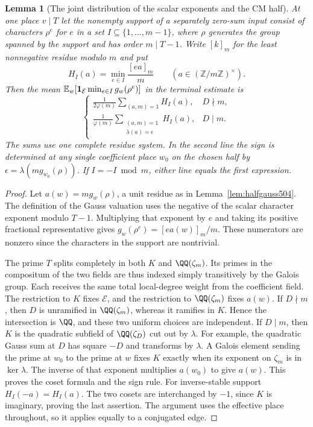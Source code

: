 \documentclass[a4paper,11pt]{article}
\newtheorem{lemma}[proposition]{Lemma}
\theoremstyle{definition}
\theoremstyle{remark}
\newcommand{\ZZ}{\mathbb Z}\newcommand{\ord}{\operatorname{ord}}
\numberwithin{equation}{section}
\begin{document}
\begin{lemma}[The joint distribution of the scalar exponents and the CM half]\leavevmode
\label{lem:jointcm508}
At one place \(v\mid T\) let the nonempty support of a separately
zero-sum input consist of characters \(\rho^e\) for \(e\) in a
set \(I\subseteq\{1,\ldots,m-1\}\), where \(\rho\) generates
the group spanned by the support and has order \(m\mid T-1\).
Write \([k]_m\) for the least nonnegative residue modulo \(m\)
and put
\[
      H_I(a)=\min_{e\in I}\frac{[ea]_m}{m}
                      \qquad (a\in(\ZZ/m\ZZ)^\times).
\]
Then the mean \(\mathbb E_w[{\bf1}_{\mathcal E}
\min_{e\in I}g_w(\rho^e)]\) in the terminal estimate is
\[
 \begin{cases}
 \displaystyle\frac{1}{2\varphi(m)}
              \sum_{(a,m)=1}H_I(a), &D\nmid m,\\[6pt]
 \displaystyle\frac{1}{\varphi(m)}
              \sum_{\substack{(a,m)=1\\\lambda(a)=\epsilon}}H_I(a),
                                                    &D\mid m .
 \end{cases}
\]
The sums use one complete residue system. In the second line the
sign is determined at any single coefficient place \(w_0\)
on the chosen half by \(\epsilon=\lambda(mg_{w_0}(\rho))\).
If \(I=-I\bmod m\), either line equals the first expression.
\end{lemma}
\begin{proof}
Let \(a(w)=m g_w(\rho)\), a unit residue as in
Lemma~\ref{lem:halfgauss504}. The definition of the Gauss
valuation uses the negative of the scalar character exponent
modulo \(T-1\). Multiplying that exponent by \(e\) and taking
its positive fractional representative gives
\(g_w(\rho^e)=[ea(w)]_m/m\). These numerators are nonzero
since the characters in the support are nontrivial.

The prime \(T\) splits completely in both \(K\) and
\(\QQ(\zeta_m)\). Its primes in the compositum of the two
fields are thus indexed simply transitively by the Galois
group. Each receives the same total local-degree weight from
the coefficient field. The restriction to \(K\) fixes
\(\mathcal E\), and the restriction to \(\QQ(\zeta_m)\)
fixes \(a(w)\). If \(D\nmid m\), then \(D\) is unramified in
\(\QQ(\zeta_m)\), whereas it ramifies in \(K\). Hence the
intersection is \(\QQ\), and these two uniform choices are
independent. If \(D\mid m\), then \(K\) is the quadratic
subfield of \(\QQ(\zeta_D)\) cut out by \(\lambda\). For
example, the quadratic Gauss sum at \(D\) has square \(-D\)
and transforms by \(\lambda\). A Galois element sending the
prime at \(w_0\) to the prime at \(w\) fixes \(K\) exactly
when its exponent on \(\zeta_m\) is in \(\ker\lambda\).
The inverse of that exponent multiplies \(a(w_0)\) to give
\(a(w)\). This proves the coset formula and the sign rule.
For inverse-stable support \(H_I(-a)=H_I(a)\). The two cosets
are interchanged by \(-1\), since \(K\) is imaginary, proving
the last assertion. The argument uses the effective place
throughout, so it applies equally to a conjugated edge.
\end{proof}
\end{document}

